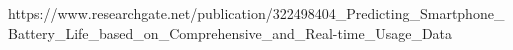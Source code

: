 https://www.researchgate.net/publication/322498404_Predicting_Smartphone_Battery_Life_based_on_Comprehensive_and_Real-time_Usage_Data